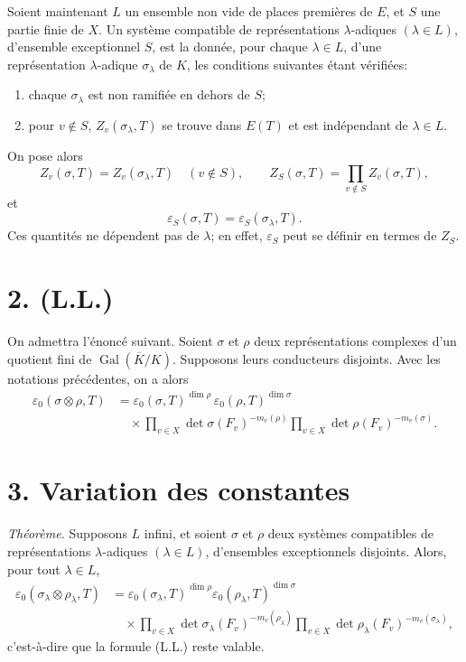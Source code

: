 \documentclass[11pt]{article}
\newcommand{\Gal}{\operatorname{Gal}}
\newcommand{\eps}{\varepsilon}
\begin{document}
Soient maintenant \(L\) un ensemble non vide de places premières de \(E\), et \(S\) une partie finie de \(X\). Un système compatible de représentations \(\lambda\)-adiques \((\lambda\in L)\), d'ensemble exceptionnel \(S\), est la donnée, pour chaque \(\lambda\in L\), d'une représentation \(\lambda\)-adique \(\sigma_\lambda\) de \(K\), les conditions suivantes étant vérifiées:
\begin{enumerate}[label=(\roman*)]
\item chaque \(\sigma_\lambda\) est non ramifiée en dehors de \(S\);
\item pour \(v\notin S\), \(Z_v(\sigma_\lambda,T)\) se trouve dans \(E(T)\) et est indépendant de \(\lambda\in L\).
\end{enumerate}
On pose alors
\[
Z_v(\sigma,T)=Z_v(\sigma_\lambda,T)\quad(v\notin S),\qquad
Z_S(\sigma,T)=\prod_{v\notin S}Z_v(\sigma,T),
\]
et
\[
\eps_S(\sigma,T)=\eps_S(\sigma_\lambda,T).
\]
Ces quantités ne dépendent pas de \(\lambda\); en effet, \(\eps_S\) peut se définir en termes de \(Z_S\).

\section*{2. (L.L.)}

On admettra l'énoncé suivant. Soient \(\sigma\) et \(\rho\) deux représentations complexes d'un quotient fini de \(\Gal(\overline K/K)\). Supposons leurs conducteurs disjoints. Avec les notations précédentes, on a alors
\[
\tag{L.L.}
\begin{aligned}
\eps_0(\sigma\otimes\rho,T)
&=\eps_0(\sigma,T)^{\dim\rho}\,
  \eps_0(\rho,T)^{\dim\sigma}  \\
&\quad\times
\prod_{v\in X}\det\sigma(F_v)^{-m_v(\rho)}
\prod_{v\in X}\det\rho(F_v)^{-m_v(\sigma)} .
\end{aligned}
\]

\section*{3. Variation des constantes}

\emph{Théorème.} Supposons \(L\) infini, et soient \(\sigma\) et \(\rho\) deux systèmes compatibles de représentations \(\lambda\)-adiques \((\lambda\in L)\), d'ensembles exceptionnels disjoints. Alors, pour tout \(\lambda\in L\),
\[
\tag{*}
\begin{aligned}
\eps_0(\sigma_\lambda\otimes\rho_\lambda,T)
&=\eps_0(\sigma_\lambda,T)^{\dim\rho}
  \eps_0(\rho_\lambda,T)^{\dim\sigma} \\
&\quad\times
\prod_{v\in X}\det\sigma_\lambda(F_v)^{-m_v(\rho_\lambda)}
\prod_{v\in X}\det\rho_\lambda(F_v)^{-m_v(\sigma_\lambda)},
\end{aligned}
\]
c'est-à-dire que la formule (L.L.) reste valable.
\end{document}
